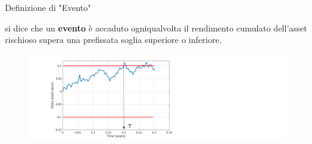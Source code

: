 

\begin{frame}{Definizione di "Evento"}
	\begin{definition}
		si dice che un \textbf{evento} è accaduto ogniqualvolta il rendimento cumulato dell'asset rischioso supera una prefissata soglia superiore o inferiore.
    \end{definition}
\begin{figure}
	\centering
	\includegraphics[width=1.2\linewidth]{Images/ExitTime}
\end{figure}
\end{frame}	

